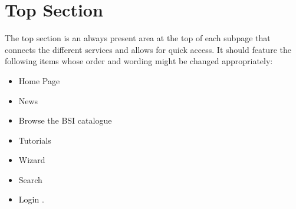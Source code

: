 \section{Top Section} 
\label{top_section}

The top section is an always present area at the top of each subpage that connects the different services and allows for quick access.
It should feature the following items whose order and wording might be changed appropriately:
\begin{itemize}
    \item Home Page
    \item News
    \item Browse the BSI catalogue
    \item Tutorials
    \item Wizard
    \item Search
    \item Login  
        . 
\end{itemize}



